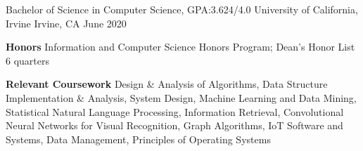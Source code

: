 
\begin{cventries}
  \cventry
    {Bachelor of Science in Computer Science, GPA:3.624/4.0} %
    {University of California, Irvine} %
    {Irvine, CA} %
    {June 2020} %
    {
      \begin{cvitems} %
         \item {\textbf{Honors} Information and Computer Science Honors Program; Dean’s Honor List 6 quarters \entrydatestyle{}}
         \vspace{0.5mm}
         \vspace{0.5mm}
         \item {\textbf{Relevant Coursework} Design \& Analysis of Algorithms, Data Structure Implementation \& Analysis, System Design, Machine Learning and Data Mining, Statistical Natural Language Processing, Information Retrieval, Convolutional Neural Networks for Visual Recognition, Graph Algorithms, IoT Software and Systems, Data Management, Principles of Operating Systems \entrydatestyle{}}
      \end{cvitems}
    }
\end{cventries}

